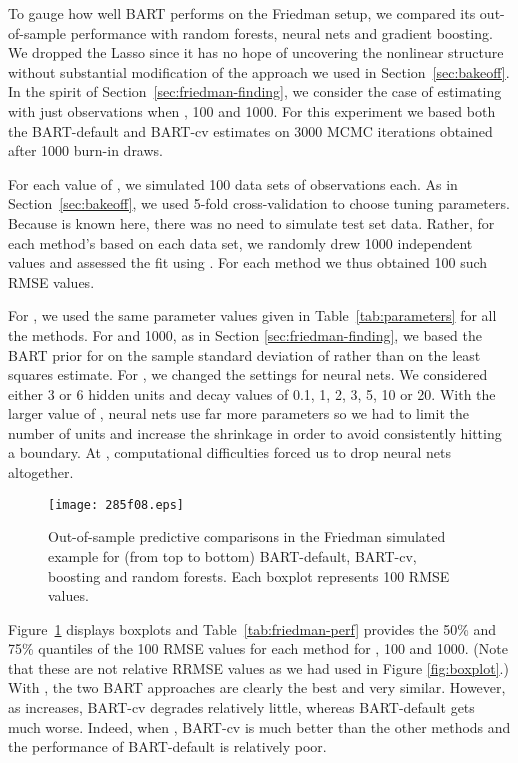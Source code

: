 \documentclass[aoas,nameyear,dvips]{arximspdf}
\begin{document}
To gauge how well BART performs on the Friedman setup,
we compared its out-of-sample performance with random forests, neural nets and gradient boosting.
We dropped the Lasso since it has no hope of uncovering the nonlinear structure without
substantial modification of
the approach we used in Section~\ref{sec:bakeoff}.
In the spirit of Section~\ref{sec:friedman-finding}, we consider the case of estimating 
with just  observations when , 100 and 1000.
For this experiment we based both the BART-default and BART-cv estimates on 3000 MCMC
iterations obtained after 1000 burn-in draws.

For each value of , we simulated 100 data sets of  observations each.
As in Section~\ref{sec:bakeoff}, we used 5-fold cross-validation to choose tuning parameters.
Because  is known here, there was no need to simulate test set data.
Rather, for each method's  based on each data set, we randomly drew 1000 independent  values
and assessed the fit using
.
For each method we thus obtained 100 such RMSE values.

For , we used the same parameter values given in
Table~\ref{tab:parameters} for all the methods. For  and
1000, as in Section \ref{sec:friedman-finding}, we based the BART
prior for  on the sample standard deviation of  rather than
on the least squares estimate.  For , we changed the settings
for neural nets.  We considered either 3 or 6 hidden units and decay
values of 0.1, 1, 2, 3, 5, 10 or 20.  With the larger value of , neural
nets use far more parameters so we had to limit the number of units and
increase the shrinkage in order to avoid consistently hitting a
boundary. At , computational difficulties forced us to drop
neural nets altogether.


\begin{figure}

\texttt{[image: 285f08.eps]}

\caption{Out-of-sample predictive comparisons in the Friedman simulated example for
(from top to bottom)  BART-default, BART-cv, boosting and random forests.
Each boxplot represents 100 RMSE values.} \label{fig:friedman-out}
\end{figure}

Figure~\ref{fig:friedman-out} displays boxplots and
Table~\ref{tab:friedman-perf} provides the 50\% and 75\% quantiles of
the 100 RMSE values for each method for , 100 and 1000.  (Note
that these are not relative RRMSE values as we had used in Figure
\ref{fig:boxplot}.)  With , the two BART approaches are clearly
the best and very similar.  However, as  increases, BART-cv degrades
relatively little, whereas BART-default gets much worse. Indeed, when
, BART-cv is much better than the other methods and the
performance of BART-default is relatively poor.
\end{document}
